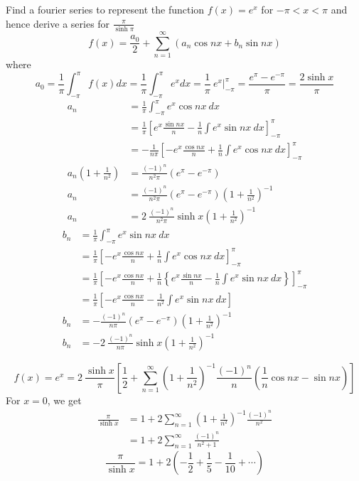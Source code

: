 \documentclass[12pt]{article}
\begin{document}
\begin{example}{
    Find a fourier series to represent the function $f(x) = e^{x}$ for $-\pi<x<\pi$ and hence derive a series for $\displaystyle \frac{\pi}{\sinh{\pi}}$
}{}
    \[
        f(x) = \frac{a_0}{2} + \sum_{n=1}^{\infty} \left( a_n \cos{nx} + b_n \sin{nx} \right)
    \] where
    \[
        a_0 = \frac{1}{\pi} \int_{-\pi}^{\pi} f(x) dx = \frac{1}{\pi} \int_{-\pi}^{\pi} e^x dx = \frac{1}{\pi} \: e^x \Bigg|_{-\pi}^{\pi} = \frac{e^{\pi} - e^{-\pi}}{\pi} = \frac{2 \sinh{x}}{\pi}
    \]
    \begin{align*}
        a_n &= \frac{1}{\pi} \int_{-\pi}^{\pi} {e^{x} \cos{nx}} \: d{x} \\
        &= \frac{1}{\pi} \left[ e^{x}\frac{\sin{nx}}{n} - \frac{1}{n}\int{e^{x}\sin{nx}} \: d{x} \right]_{-\pi}^{\pi} \\
        &= -\frac{1}{n\pi} \left[ -e^{x}\frac{\cos{nx}}{n} + \frac{1}{n} \int{e^{x}\cos{nx}} \: d{x} \right]_{-\pi}^{\pi} \\
        a_n \left( 1+\frac{1}{n^2} \right) &= \frac{(-1)^n}{n^2\pi} \left( e^{\pi} - e^{-\pi} \right) \\
        a_n &= \frac{(-1)^n}{n^2\pi} \left( e^{\pi} - e^{-\pi} \right) \left( 1+\frac{1}{n^2} \right)^{-1} \\
        a_n &= 2 \: \frac{(-1)^n}{n^2\pi} \sinh{x} \left( 1+\frac{1}{n^2} \right)^{-1}
    \end{align*}
    \begin{align*}
        b_n &= \frac{1}{\pi} \int_{-\pi}^{\pi} {e^{x}\sin{nx}} \: d{x} \\
        &= \frac{1}{\pi} \left[ -e^{x}\frac{\cos{nx}}{n} + \frac{1}{n}\int{e^{x}\cos{nx}} \: d{x} \right]_{-\pi}^{\pi} \\
        &= \frac{1}{\pi} \left[ -e^{x}\frac{\cos{nx}}{n} + \frac{1}{n} \left\{ e^{x}\frac{\sin{nx}}{n} - \frac{1}{n} \int{e^{x}\sin{nx}} \: d{x} \right\} \right]_{-\pi}^{\pi} \\
        &= \frac{1}{\pi} \left[ -e^{x}\frac{\cos{nx}}{n} - \frac{1}{n^2} \int{e^{x}\sin{nx}} \: d{x} \right] \\
        b_n &= - \frac{(-1)^n}{n\pi} \left( e^{\pi} - e^{-\pi} \right) \left( 1+\frac{1}{n^2} \right)^{-1} \\
        b_n &= -2 \: \frac{(-1)^n}{n\pi} \sinh{x} \left( 1+\frac{1}{n^2} \right)^{-1}
    \end{align*}

    \[
        \boxed{ f(x) = e^{x} = 2 \: \frac{\sinh{x}}{\pi} \left[ \frac{1}{2} + \sum_{n=1}^{\infty} \left( 1 + \frac{1}{n^2} \right)^{-1} \frac{(-1)^n}{n} \left( \frac{1}{n}\cos{nx} - \sin{nx} \right) \right] }
    \]
    For $x=0$, we get
    \begin{align*}
        \frac{\pi}{\sinh{x}} &= 1 + 2 \sum_{n=1}^{\infty} \left( 1 + \frac{1}{n^2} \right)^{-1} \frac{(-1)^n}{n^2} \\
        &= 1 + 2 \sum_{n=1}^{\infty} \frac{(-1)^n}{n^2 + 1}
    \end{align*}
    \[
        \boxed{ \frac{\pi}{\sinh{x}} = 1 + 2 \left( -\frac{1}{2} + \frac{1}{5} - \frac{1}{10} + \cdots \right) }
    \]
\end{example}
\end{document}
